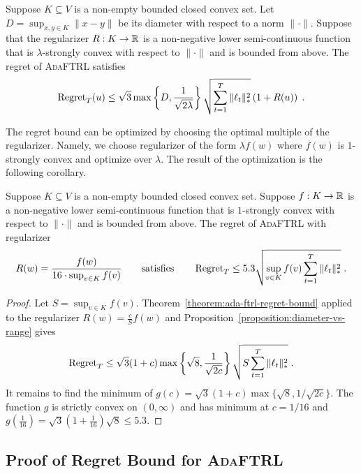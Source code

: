 \begin{theorem}
\label{theorem:ada-ftrl-regret-bound}
Suppose $K \subseteq V$ is a non-empty bounded closed convex set. Let $D =
\sup_{x,y \in K} \|x - y\|$ be its diameter with respect to a norm $\|\cdot\|$.
Suppose that the regularizer $R:K \to \mathbb{R}$ is a non-negative lower
semi-continuous function that is $\lambda$-strongly convex with respect to
$\|\cdot\|$ and is bounded from above.  The regret of \textsc{AdaFTRL}
satisfies
$$
\operatorname{Regret}_T(u)
\le \sqrt{3} \max\left\{D, \frac{1}{\sqrt{2\lambda}} \right\}
    \sqrt{\sum_{t=1}^T \|\ell_t\|_*^2} \left(1 + R(u) \right) \; .
$$
\end{theorem}

The regret bound can be optimized by choosing the optimal multiple of the
regularizer.  Namely, we choose regularizer of the form $\lambda f(w)$ where
$f(w)$ is $1$-strongly convex and optimize over $\lambda$. The result of the
optimization is the following corollary.

\begin{corollary}
\label{corollary:ada-ftrl-regret-bound}
Suppose $K \subseteq V$ is a non-empty bounded closed convex set. Suppose $f:K
\to \mathbb{R}$ is a non-negative lower semi-continuous function that is $1$-strongly
convex with respect to $\|\cdot\|$ and is bounded from above.  The regret of
\textsc{AdaFTRL} with regularizer
$$
R(w) = \frac{f(w)}{16 \cdot \sup_{v \in K} f(v)}
\qquad \text{satisfies} \qquad
\operatorname{Regret}_T \le
5.3 \sqrt{\sup_{v \in K} f(v) \sum_{t=1}^T \|\ell_t\|_*^2} \; .
$$
\end{corollary}
%
\begin{proof}
Let $S = \sup_{v \in K} f(v)$. Theorem~\ref{theorem:ada-ftrl-regret-bound}
applied to the regularizer $R(w) = \frac{c}{S} f(w)$ and
Proposition~\ref{proposition:diameter-vs-range} gives
$$
\operatorname{Regret}_T \le \sqrt{3}(1 + c) \max\left\{\sqrt{8}, \frac{1}{\sqrt{2c}} \right\} \sqrt{S \sum_{t=1}^T \|\ell_t\|_*^2} \; .
$$
It remains to find the minimum of $g(c) = \sqrt{3}(1 + c) \max\{\sqrt{8},
1/\sqrt{2c}\}$.  The function $g$ is strictly convex on $(0, \infty)$ and has
minimum at $c=1/16$ and $g(\frac{1}{16}) = \sqrt{3}(1+\frac{1}{16})\sqrt{8} \le
5.3$.
\end{proof}



\subsection{Proof of Regret Bound for \textsc{AdaFTRL}}
\label{section:ada-ftrl-regret-bound}

